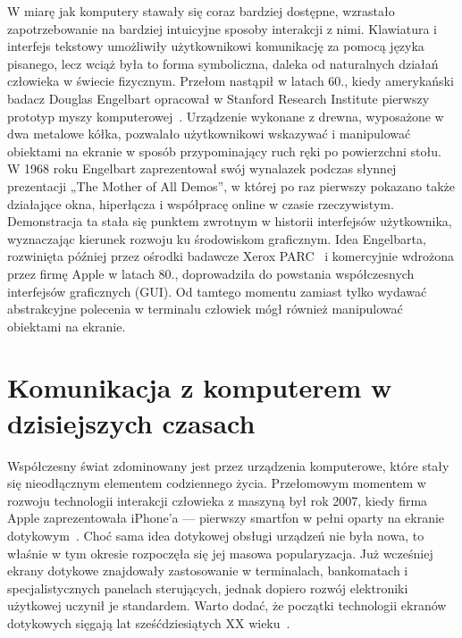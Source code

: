 W miarę jak komputery stawały się coraz bardziej dostępne, wzrastało zapotrzebowanie na bardziej intuicyjne sposoby interakcji z nimi. Klawiatura i interfejs tekstowy umożliwiły użytkownikowi komunikację za pomocą języka pisanego, lecz wciąż była to forma symboliczna, daleka od naturalnych działań człowieka w świecie fizycznym. Przełom nastąpił w latach 60., kiedy amerykański badacz Douglas Engelbart opracował w Stanford Research Institute pierwszy prototyp myszy komputerowej~\cite{engelbart1968}. Urządzenie wykonane z drewna, wyposażone w dwa metalowe kółka, pozwalało użytkownikowi wskazywać i manipulować obiektami na ekranie w sposób przypominający ruch ręki po powierzchni stołu. W 1968 roku Engelbart zaprezentował swój wynalazek podczas słynnej prezentacji „The Mother of All Demos”, w której po raz pierwszy pokazano także działające okna, hiperłącza i współpracę online w czasie rzeczywistym. Demonstracja ta stała się punktem zwrotnym w historii interfejsów użytkownika, wyznaczając kierunek rozwoju ku środowiskom graficznym. Idea Engelbarta, rozwinięta później przez ośrodki badawcze Xerox PARC~\cite{myers1998} i komercyjnie wdrożona przez firmę Apple w latach 80., doprowadziła do powstania współczesnych interfejsów graficznych (GUI). Od tamtego momentu zamiast tylko wydawać abstrakcyjne polecenia w terminalu człowiek mógł również manipulować obiektami na ekranie.

\section{Komunikacja z komputerem w dzisiejszych czasach}

Współczesny świat zdominowany jest przez urządzenia komputerowe, które stały się nieodłącznym elementem codziennego życia. Przełomowym momentem w rozwoju technologii interakcji człowieka z maszyną był rok 2007, kiedy firma Apple zaprezentowała iPhone'a --- pierwszy smartfon w pełni oparty na ekranie dotykowym~\cite{isaacson2011}. Choć sama idea dotykowej obsługi urządzeń nie była nowa, to właśnie w tym okresie rozpoczęła się jej masowa popularyzacja. Już wcześniej ekrany dotykowe znajdowały zastosowanie w terminalach, bankomatach i specjalistycznych panelach sterujących, jednak dopiero rozwój elektroniki użytkowej uczynił je standardem. Warto dodać, że początki technologii ekranów dotykowych sięgają lat sześćdziesiątych XX wieku~\cite{johnson1965}.

